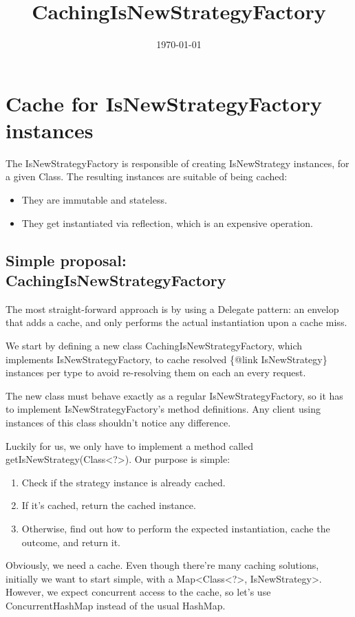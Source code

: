 \documentclass[11pt]{article}
\date{\today}
\title{CachingIsNewStrategyFactory}
\begin{document}
\maketitle
\tableofcontents

\section{Cache for IsNewStrategyFactory instances}
\label{sec-1}

The IsNewStrategyFactory is responsible of creating IsNewStrategy instances,
for a given Class. The resulting instances are suitable of being cached:
\begin{itemize}
\item They are immutable and stateless.
\item They get instantiated via reflection, which is an expensive operation.
\end{itemize}

\subsection{Simple proposal: CachingIsNewStrategyFactory}
\label{sec-1-1}

The most straight-forward approach is by using a Delegate pattern: an envelop that adds
a cache, and only performs the actual instantiation upon a cache miss.

We start by defining a new class CachingIsNewStrategyFactory, which implements IsNewStrategyFactory,
to cache resolved \{@link IsNewStrategy\} instances per type to avoid re-resolving them on each an every request.

The new class must behave exactly as a regular IsNewStrategyFactory, so it has to implement
IsNewStrategyFactory's method definitions. Any client using instances of this class shouldn't notice any difference.

Luckily for us, we only have to implement a method called getIsNewStrategy(Class<?>). Our purpose is simple:
\begin{enumerate}
\item Check if the strategy instance is already cached.
\item If it's cached, return the cached instance.
\item Otherwise, find out how to perform the expected instantiation, cache the outcome, and return it.
\end{enumerate}

Obviously, we need a cache. Even though there're many caching solutions, initially we want to start simple, with a Map<Class<?>, IsNewStrategy>.
However, we expect concurrent access to the cache, so let's use ConcurrentHashMap instead of the usual HashMap.
\end{document}
